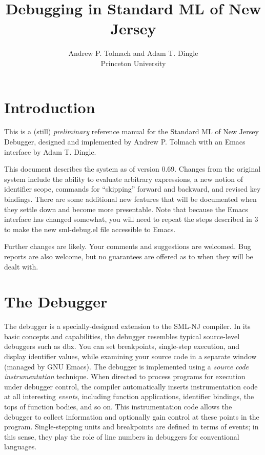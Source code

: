 \setlength{\textheight}{8.8in}
\setlength{\textwidth}{6.5in}
\setlength{\oddsidemargin}{0in}
\setlength{\topmargin}{-.1in}
\setlength{\headheight}{0in}
\setlength{\headsep}{0in}

\title{Debugging in Standard ML of New Jersey}
\author{Andrew P. Tolmach
and Adam T. Dingle \\ Princeton University}

\maketitle
\section{Introduction}
This is a (still) {\em preliminary} reference 
manual for the Standard ML of New Jersey Debugger, 
designed and implemented by Andrew P. Tolmach with an Emacs interface
by Adam T. Dingle.  

This document describes the system as of version 0.69. Changes from the 
original system include the ability to evaluate arbitrary expressions,
a new notion of identifier scope, commands for ``skipping'' forward 
and backward, and revised key bindings.  There are some additional
new features that will be documented when they settle down and become
more presentable. Note that because the Emacs interface has changed
somewhat, you will need to repeat the steps described in 3 to make the
new sml-debug.el file accessible to Emacs.

Further changes are likely. Your comments and suggestions are welcomed.
Bug reports are also welcome, but no guarantees are offered as to when 
they will be dealt with.

\section{The Debugger}
The debugger is a specially-designed extension to the SML-NJ compiler.
In its basic concepts and capabilities, the debugger resembles typical 
source-level debuggers such as dbx.  You can set breakpoints, single-step 
execution, and display identifier values, while examining your source code 
in a separate window (managed by GNU Emacs).  The debugger is implemented
using a {\em source code instrumentation} technique.  When directed to 
process programs
for execution under debugger control, the compiler automatically inserts
instrumentation code at all interesting {\em events}, including function
applications, identifier bindings, the tops of function bodies, and so on.
This instrumentation code allows the debugger to collect information and 
optionally gain control at these points in the program.  Single-stepping 
units and breakpoints are defined in terms of events; in this sense, they
play the role of line numbers in debuggers for conventional languages.


